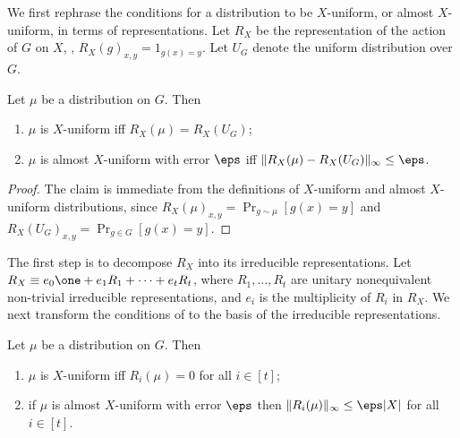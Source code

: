 We first rephrase the conditions for a distribution to be
$X$-uniform, or almost $X$-uniform, in terms of representations. Let
$R_X$ be the representation of the action of $G$ on $X$,
\ie, $R_X(g)_{x,y}=1_{g(x)=y}$. Let $U_G$ denote the uniform distribution
over $G$.

\begin{proposition}\label{prop:rephrase_conditions_dist_Rx}
Let $\mu$ be a distribution on $G$. Then
\begin{enumerate}
\item $\mu$ is $X$-uniform iff $R_X(\mu) = R_X(U_G)$;
\item $\mu$ is almost $X$-uniform with
error $\eps$ iff $\|R_X(\mu)-R_X(U_G)\|_{\infty} \le \eps$.
\end{enumerate}
\end{proposition}

\begin{proof}
The claim is immediate from the definitions of $X$-uniform
and almost $X$-uniform distributions,
since $R_X(\mu)_{x,y}=\Pr_{g \sim \mu}[g(x)=y]$
and $R_X(U_G)_{x,y} = \Pr_{g \in G}[g(x)=y]$.
\end{proof}

The first step is to decompose $R_X$ into its irreducible
representations. Let $R_X \equiv e_0 \one + e_1 R_1 + \cdots + e_t R_t$,
where $R_1,\ldots,R_t$ are unitary nonequivalent non-trivial irreducible
representations, and $e_i$ is the multiplicity of $R_i$ in $R_X$. We next
transform the conditions of 
to the basis of the irreducible representations.

\begin{proposition}\label{prop:rephrase_conditions_dist_irr}
Let $\mu$ be a distribution on $G$. Then
\begin{enumerate}
\item $\mu$ is $X$-uniform iff $R_i(\mu) = 0$ for all $i \in [t]$;
\item if $\mu$ is almost $X$-uniform with error
$\eps$ then $\|R_i(\mu)\|_{\infty} \le \eps |X|$ for all $i \in [t]$.
\end{enumerate}
\end{proposition}

